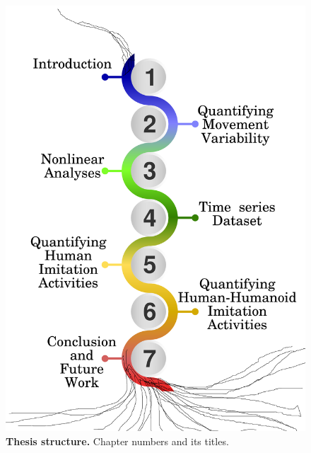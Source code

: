 \begin{figure}
\centering
\includegraphics[width=1.0\textwidth]{thesis-structure-v03}
    \caption{
	{\bf Thesis structure.}
	Chapter numbers and its titles.
	  }
    \label{fig:ts}
\end{figure}





